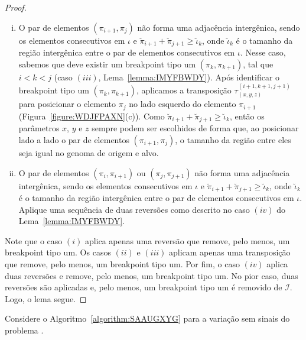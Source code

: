 \begin{proof}
\begin{enumerate}[i.]
  \item O par de elementos $(\pi_{i+1},\pi_{j})$ não forma uma adjacência intergênica, sendo os elementos consecutivos em $\iota$ e $\breve\pi_{i+1} + \breve\pi_{j+1} \ge \breve\iota_k$, onde $\breve\iota_k$ é o tamanho da região intergênica entre o par de elementos consecutivos em $\iota$. Nesse caso, sabemos que deve existir um breakpoint tipo um $(\pi_k, \pi_{k+1})$, tal que $i < k < j$ (caso $(iii)$, Lema~\ref{lemma:IMYFBWDY}). Após identificar o breakpoint tipo um $(\pi_k, \pi_{k+1})$, aplicamos a transposição $\tau^{(i+1,k+1,j+1)}_{(x,y,z)}$ para posicionar o elemento $\pi_{j}$ no lado esquerdo do elemento $\pi_{i+1}$ (Figura~\ref{figure:WDJFPAXN}(c)). Como $\breve\pi_{i+1} + \breve\pi_{j+1} \ge \breve\iota_k$, então os parâmetros $x$, $y$ e $z$ sempre podem ser escolhidos de forma que, ao posicionar lado a lado o par de elementos $(\pi_{i+1},\pi_{j})$, o tamanho da região entre eles seja igual no genoma de origem e alvo.
  \item O par de elementos $(\pi_{i},\pi_{i+1})$ ou $(\pi_{j},\pi_{j+1})$ não forma uma adjacência intergênica, sendo os elementos consecutivos em $\iota$ e $\breve\pi_{i+1} + \breve\pi_{j+1} \ge \breve\iota_k$, onde $\breve\iota_k$ é o tamanho da região intergênica entre o par de elementos consecutivos em $\iota$. Aplique uma sequência de duas reversões como descrito no caso $(iv)$ do Lema~\ref{lemma:IMYFBWDY}.
\end{enumerate}
Note que o caso $(i)$ aplica apenas uma reversão que remove, pelo menos, um breakpoint tipo um. Os casos $(ii)$ e $(iii)$ aplicam apenas uma transposição que remove, pelo menos, um breakpoint tipo um. Por fim, o caso $(iv)$ aplica duas reversões e remove, pelo menos, um breakpoint tipo um. No pior caso, duas reversões são aplicadas e, pelo menos, um breakpoint tipo um é removido de $\mathcal{I}$. Logo, o lema segue. 
\end{proof}



Considere o Algoritmo~\ref{algorithm:SAAUGXYG} para a variação sem sinais do problema \SbIRT{}.



